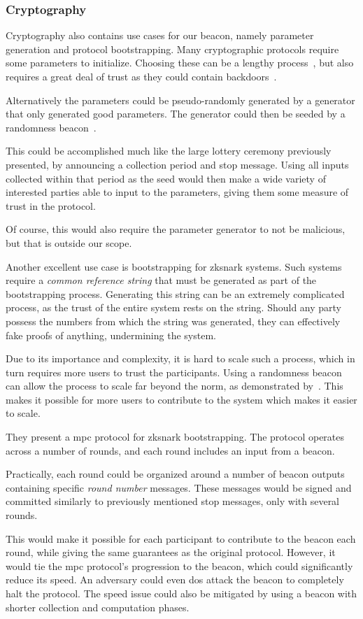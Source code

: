 \subsubsection{Cryptography}
Cryptography also contains use cases for our beacon, namely parameter generation and protocol bootstrapping.
Many cryptographic protocols require some parameters to initialize.
Choosing these can be a lengthy process~\cite{mpcsnarks}, but also requires a great deal of trust as they could contain backdoors~\cite{nist2014backdoor}.

Alternatively the parameters could be pseudo-randomly generated by a generator that only generated good parameters. The generator could then be seeded by a randomness beacon~\cite{baigneres2015trap}.

This could be accomplished much like the large lottery ceremony previously presented, by announcing a collection period and stop message. Using all inputs collected within that period as the seed would then make a wide variety of interested parties able to input to the parameters, giving them some measure of trust in the protocol.

Of course, this would also require the parameter generator to not be malicious, but that is outside our scope.


Another excellent use case is bootstrapping for \gls{zksnark} systems. Such systems require a \emph{common reference string} that must be generated as part of the bootstrapping process. Generating this string can be an extremely complicated process, as the trust of the entire system rests on the string. Should any party possess the numbers from which the string was generated, they can effectively fake proofs of anything, undermining the system.

Due to its importance and complexity, it is hard to scale such a process, which in turn requires more users to trust the participants. Using a randomness beacon can allow the process to scale far beyond the norm, as demonstrated by~\citet{mpcsnarks}. This makes it possible for more users to contribute to the system which makes it easier to scale.

They present a \acrshort{mpc} protocol for \acrshort{zksnark} bootstrapping. The protocol operates across a number of rounds, and each round includes an input from a beacon.

Practically, each round could be organized around a number of beacon outputs containing specific \textit{round number} messages. These messages would be signed and committed similarly to previously mentioned stop messages, only with several rounds.

This would make it possible for each participant to contribute to the beacon each round, while giving the same guarantees as the original protocol. However, it would tie the \acrshort{mpc} protocol's progression to the beacon, which could significantly reduce its speed. An adversary could even \acrshort{dos} attack the beacon to completely halt the protocol.
The speed issue could also be mitigated by using a beacon with shorter collection and computation phases.
